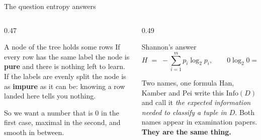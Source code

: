 \documentclass[aspectratio=169]{beamer}
\begin{document}
\begin{frame}[shrink=5]{The question entropy answers}
  \begin{columns}[T]
    \begin{column}{0.47\textwidth}
      \begin{block}{A node of the tree holds some rows}
        If every row has the same label the node is \textbf{pure} and there is
        nothing left to learn. If the labels are evenly split the node is as
        \textbf{impure} as it can be: knowing a row landed here tells you
        nothing.
      \end{block}
      \begin{alertblock}{So we want a number that is}
        \small $0$ in the first case, maximal in the second, and smooth in
        between.
      \end{alertblock}
    \end{column}
    \begin{column}{0.49\textwidth}
      \begin{exampleblock}{Shannon's answer}
        \[
          H \;=\; -\sum_{i=1}^{m} p_i \log_2 p_i ,
          \qquad 0\log_2 0 = 0 .
        \]
      \end{exampleblock}
      \begin{block}{Two names, one formula}
        \small Han, Kamber and Pei write this $\mathrm{Info}(D)$ and call it
        \emph{the expected information needed to classify a tuple in $D$}.
        Both names appear in examination papers. \textbf{They are the same
        thing.}
      \end{block}
    \end{column}
  \end{columns}
\end{frame}
\end{document}
